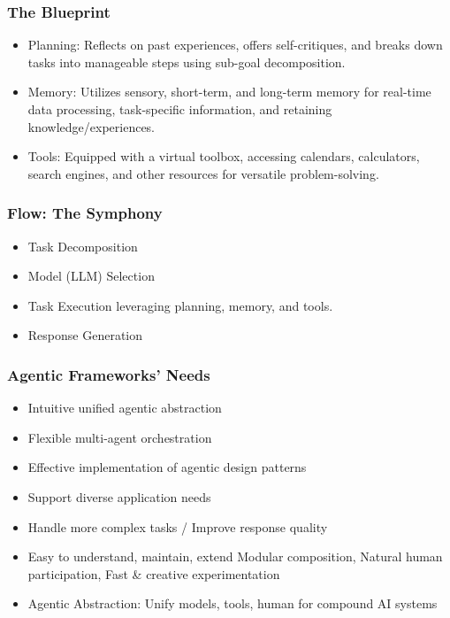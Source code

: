 \begin{frame}[fragile]\frametitle{The Blueprint}
  \begin{itemize}
    \item Planning: Reflects on past experiences, offers self-critiques, and breaks down tasks into manageable steps using sub-goal decomposition.
    \item Memory: Utilizes sensory, short-term, and long-term memory for real-time data processing, task-specific information, and retaining knowledge/experiences.
    \item Tools: Equipped with a virtual toolbox, accessing calendars, calculators, search engines, and other resources for versatile problem-solving.
  \end{itemize}
\end{frame}

\begin{frame}[fragile]\frametitle{Flow: The Symphony}
  \begin{itemize}
    \item Task Decomposition %
    \item Model (LLM) Selection %
    \item Task Execution leveraging planning, memory, and tools.
    \item Response Generation %
  \end{itemize}
\end{frame}

\begin{frame}[fragile]\frametitle{Agentic Frameworks' Needs}

  \begin{itemize}
  \item Intuitive unified agentic abstraction
  \item Flexible multi-agent orchestration
  \item Effective implementation of agentic design patterns
  \item Support diverse application needs
    \item  Handle more complex tasks / Improve response quality
	\item Easy to understand, maintain, extend Modular composition, Natural human participation, Fast \& creative experimentation
	  \item Agentic Abstraction: Unify models, tools, human for compound AI systems

  \end{itemize}
\end{frame}

